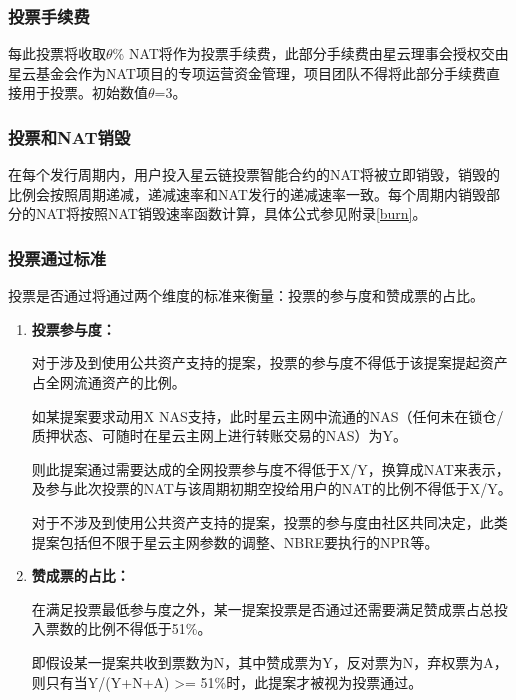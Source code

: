\subsubsection{投票手续费}

每此投票将收取$\theta$\% NAT将作为投票手续费，此部分手续费由星云理事会授权交由星云基金会作为NAT项目的专项运营资金管理，项目团队不得将此部分手续费直接用于投票。初始数值$\theta$=3。

\subsubsection{投票和NAT销毁}

在每个发行周期内，用户投入星云链投票智能合约的NAT将被立即销毁，销毁的比例会按照周期递减，递减速率和NAT发行的递减速率一致。每个周期内销毁部分的NAT将按照NAT销毁速率函数计算，具体公式参见附录\ref{burn}。

\subsubsection{投票通过标准}
	
投票是否通过将通过两个维度的标准来衡量：投票的参与度和赞成票的占比。

\begin{enumerate}
	\item 

	\textbf{投票参与度：}

	对于涉及到使用公共资产支持的提案，投票的参与度不得低于该提案提起资产占全网流通资产的比例。

	如某提案要求动用X NAS支持，此时星云主网中流通的NAS（任何未在锁仓/质押状态、可随时在星云主网上进行转账交易的NAS）为Y。

	则此提案通过需要达成的全网投票参与度不得低于X/Y，换算成NAT来表示，及参与此次投票的NAT与该周期初期空投给用户的NAT的比例不得低于X/Y。

	对于不涉及到使用公共资产支持的提案，投票的参与度由社区共同决定，此类提案包括但不限于星云主网参数的调整、NBRE要执行的NPR等。

	\item

	\textbf{赞成票的占比：}

	在满足投票最低参与度之外，某一提案投票是否通过还需要满足赞成票占总投入票数的比例不得低于51\%。

	即假设某一提案共收到票数为N，其中赞成票为Y，反对票为N，弃权票为A，则只有当Y/(Y+N+A) >= 51\%时，此提案才被视为投票通过。
\end{enumerate}

